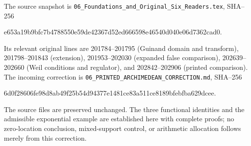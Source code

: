 The source snapshot is
\texttt{06\_Foundations\_and\_Original\_Six\_Readers.tex}, SHA--256
\begin{center}\small\ttfamily
e653a19b9bfc7b4788550e59de42367d52ed666598e46540d040e06d7362cad0.
\end{center}
Its relevant original lines are 201784--201795 (Guinand domain and
transform), 201798--201843 (extension), 201953--202030 (expanded false
comparison), 202639--202660 (Weil conditions and regulator), and
202842--202906 (printed comparison).  The incoming correction is
\texttt{06\_PRINTED\_ARCHIMEDEAN\_CORRECTION.md}, SHA--256
\begin{center}\small\ttfamily
6d0f28606fe98d8ab49f25b54d94377e1481ce83a511ce8189bfebfba629dcee.
\end{center}
The source files are preserved unchanged.  The three functional identities
and the admissible exponential example are established here with complete
proofs; no zero-location conclusion, mixed-support control, or arithmetic
allocation follows merely from this correction.



